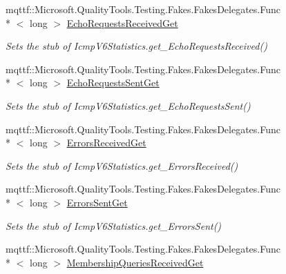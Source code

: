 \begin{DoxyCompactItemize}
mqttf\-::\-Microsoft.\-Quality\-Tools.\-Testing.\-Fakes.\-Fakes\-Delegates.\-Func\\*
$<$ long $>$ \hyperlink{class_system_1_1_net_1_1_network_information_1_1_fakes_1_1_stub_icmp_v6_statistics_ac2159e1f08a68f83eb38431a54148db7}{Echo\-Requests\-Received\-Get}
\begin{DoxyCompactList}\small\item\em Sets the stub of Icmp\-V6\-Statistics.\-get\-\_\-\-Echo\-Requests\-Received()\end{DoxyCompactList}\item 
mqttf\-::\-Microsoft.\-Quality\-Tools.\-Testing.\-Fakes.\-Fakes\-Delegates.\-Func\\*
$<$ long $>$ \hyperlink{class_system_1_1_net_1_1_network_information_1_1_fakes_1_1_stub_icmp_v6_statistics_aa127ce0a2001552bb7d9a474e5a76d9c}{Echo\-Requests\-Sent\-Get}
\begin{DoxyCompactList}\small\item\em Sets the stub of Icmp\-V6\-Statistics.\-get\-\_\-\-Echo\-Requests\-Sent()\end{DoxyCompactList}\item 
mqttf\-::\-Microsoft.\-Quality\-Tools.\-Testing.\-Fakes.\-Fakes\-Delegates.\-Func\\*
$<$ long $>$ \hyperlink{class_system_1_1_net_1_1_network_information_1_1_fakes_1_1_stub_icmp_v6_statistics_a6c9f7a697d5657f537428b871a53a4b3}{Errors\-Received\-Get}
\begin{DoxyCompactList}\small\item\em Sets the stub of Icmp\-V6\-Statistics.\-get\-\_\-\-Errors\-Received()\end{DoxyCompactList}\item 
mqttf\-::\-Microsoft.\-Quality\-Tools.\-Testing.\-Fakes.\-Fakes\-Delegates.\-Func\\*
$<$ long $>$ \hyperlink{class_system_1_1_net_1_1_network_information_1_1_fakes_1_1_stub_icmp_v6_statistics_acced50ac4f6a64a2242a5895465b44dd}{Errors\-Sent\-Get}
\begin{DoxyCompactList}\small\item\em Sets the stub of Icmp\-V6\-Statistics.\-get\-\_\-\-Errors\-Sent()\end{DoxyCompactList}\item 
mqttf\-::\-Microsoft.\-Quality\-Tools.\-Testing.\-Fakes.\-Fakes\-Delegates.\-Func\\*
$<$ long $>$ \hyperlink{class_system_1_1_net_1_1_network_information_1_1_fakes_1_1_stub_icmp_v6_statistics_a42ee420d071389b3e89a818510539dc3}{Membership\-Queries\-Received\-Get}

\end{DoxyCompactItemize}
